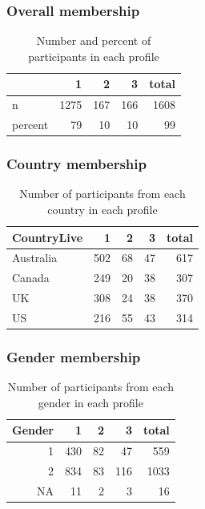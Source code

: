 \documentclass[]{article}
\begin{document}
\hypertarget{overall-membership-1}{%
\subsubsection{Overall membership}\label{overall-membership-1}}

\begin{table}[H]

\caption{\label{tab:unnamed-chunk-11}Number and percent of participants in each profile}
\centering
\fontsize{6}{8}\selectfont
\begin{tabular}[t]{lrrrr}
\toprule
  & 1 & 2 & 3 & total\\
\midrule
n & 1275 & 167 & 166 & 1608\\
percent & 79 & 10 & 10 & 99\\
\bottomrule
\end{tabular}
\end{table}

\hypertarget{country-membership-1}{%
\subsubsection{Country membership}\label{country-membership-1}}

\begin{table}[H]

\caption{\label{tab:unnamed-chunk-12}Number of participants from each country in each profile}
\centering
\fontsize{6}{8}\selectfont
\begin{tabular}[t]{lrrrr}
\toprule
CountryLive & 1 & 2 & 3 & total\\
\midrule
Australia & 502 & 68 & 47 & 617\\
Canada & 249 & 20 & 38 & 307\\
UK & 308 & 24 & 38 & 370\\
US & 216 & 55 & 43 & 314\\
\bottomrule
\end{tabular}
\end{table}

\hypertarget{gender-membership-1}{%
\subsubsection{Gender membership}\label{gender-membership-1}}

\begin{table}[H]

\caption{\label{tab:unnamed-chunk-13}Number of participants from each gender in each profile}
\centering
\fontsize{6}{8}\selectfont
\begin{tabular}[t]{rrrrr}
\toprule
Gender & 1 & 2 & 3 & total\\
\midrule
1 & 430 & 82 & 47 & 559\\
2 & 834 & 83 & 116 & 1033\\
NA & 11 & 2 & 3 & 16\\
\bottomrule
\end{tabular}
\end{table}
\end{document}
